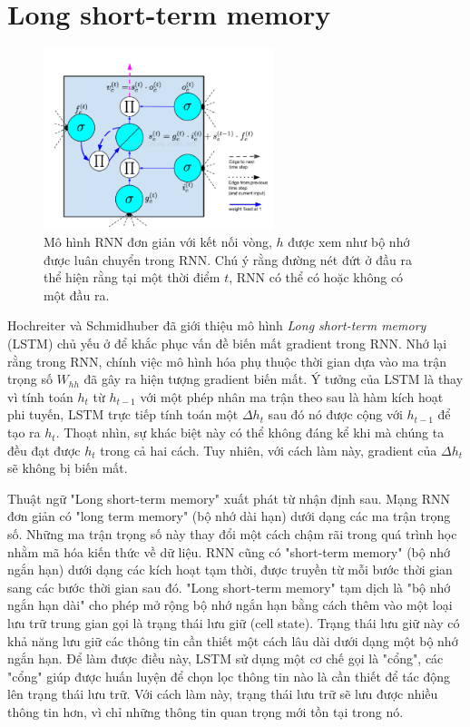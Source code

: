 \section{Long short-term memory}

\begin{figure}
	\centering
	\includegraphics[width=0.6\textwidth]{lstmCell}
	\caption[Một "LSTM cell"]{Mô hình RNN đơn giản với kết nối vòng, \textbf{$h$} được xem như bộ nhớ được luân chuyển trong RNN. Chú ý rằng đường nét đứt ở đầu ra thể hiện rằng tại một thời điểm $t$, RNN có thể có hoặc không có một đầu ra.}
	\label{fig_lstmCell}
\end{figure}

Hochreiter và Schmidhuber \cite{hochreiter1997} đã giới thiệu mô hình \textit{Long short-term memory} (LSTM) chủ yếu ở để khắc phục vấn đề biến mất gradient trong RNN. Nhớ lại rằng trong RNN, chính việc mô hình hóa phụ thuộc thời gian dựa vào ma trận trọng số $W_{hh}$ đã gây ra hiện tượng gradient biến mất. Ý tưởng của LSTM là thay vì tính toán $h_t$ từ $h_{t-1}$ với một phép nhân ma trận theo sau là hàm kích hoạt phi tuyến, LSTM trực tiếp tính toán một $\Delta h_t$ sau đó nó được cộng với $h_{t-1}$ để tạo ra $h_t$. Thoạt nhìn, sự khác biệt này có thể không đáng kể khi mà chúng ta đều đạt được $h_t$ trong cả hai cách. Tuy nhiên, với cách làm này, gradient của $\Delta h_t$ sẽ không bị biến mất.

Thuật ngữ "Long short-term memory" xuất phát từ nhận định sau. Mạng RNN đơn giản có "long term memory" (bộ nhớ dài hạn) dưới dạng các ma trận trọng số. Những ma trận trọng số này thay đổi một cách chậm rãi trong quá trình học nhằm mã hóa kiến thức về dữ liệu. RNN cũng có "short-term memory" (bộ nhớ ngắn hạn) dưới dạng các kích hoạt tạm thời, được truyền từ mỗi bước thời gian sang các bước thời gian sau đó. "Long short-term memory" tạm dịch là "bộ nhớ ngắn hạn dài" cho phép mở rộng bộ nhớ ngắn hạn bằng cách thêm vào một loại lưu trữ trung gian gọi là trạng thái lưu giữ (cell state). Trạng thái lưu giữ này có khả năng lưu giữ các thông tin cần thiết một cách lâu dài dưới dạng một bộ nhớ ngắn hạn. Để làm được điều này, LSTM sử dụng một cơ chế gọi là "cổng", các "cổng" giúp được huấn luyện để chọn lọc thông tin nào là cần thiết để tác động lên trạng thái lưu trữ. Với cách làm này, trạng thái lưu trữ sẽ lưu được nhiều thông tin hơn, vì chỉ những thông tin quan trọng mới tồn tại trong nó.

